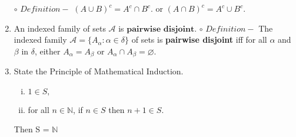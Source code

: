 \documentclass[11pt]{article}
\begin{document}
\begin{enumerate}
        \newline $\circ$ $Definition - $ $(A \cup B)^c = A^c \cap B^c.$ or $(A \cap B)^c = A^c \cup B^c.$
    \item An indexed family of sets $\mathscr{A}$ is $\mathbf{pairwise}$ $\mathbf{disjoint}$.
        \newline $\circ$ $Definition - $ The indexed family $\mathscr{A} = \{A_{\alpha}: \alpha \in \delta \}$ of sets is \textbf{pairwise disjoint} iff for all $\alpha$ and $\beta$ in $\delta$, either $A_\alpha = A_\beta$ or $A_\alpha \cap A_\beta = \varnothing.$
    \item State the Principle of Mathematical Induction.
    \begin{enumerate}[(i)]
        \item $1\in S,$ 
        \item for all $n\in \mathbb{N}$, if $n \in S$ then $n + 1 \in S.$
    \end{enumerate}
    Then S = $\mathbb{N}$
        

\end{enumerate}
\end{document}
